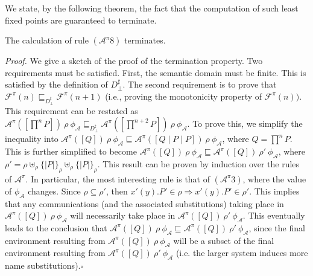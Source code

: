 \documentclass[10pt,a4paper,final,oneside,fleqn]{book}
\begin{document}
We state, by the following theorem, the fact that the computation of such least fixed points are guaranteed to terminate.
\begin{theor}
$ $\\
The calculation of rule $(\mathcal{A}^\pi 8)$ terminates.
\end{theor}
{\itshape Proof.\/} We give a sketch of the proof of the termination property. Two requirements must be satisfied.  First, the semantic domain must be finite. This is satisfied by the definition of $D^\sharp_\bot$. The second requirement is to prove that $\mathcal{F}^\pi(n)\sqsubseteq_{D^\sharp_\bot}\mathcal{F}^\pi(n+1)$ (i.e., proving the monotonicity property of $\mathcal{F}^{\pi}(n))$.  This requirement can be restated as  $\mathcal{A}^{\pi}(\![\overset{n}{\prod}P]\!)~\rho~\phi_\mathcal{A}\sqsubseteq_{D^\sharp_\bot}\mathcal{A}^\pi(\![\overset{n+2}{\prod}P]\!)~\rho~\phi_\mathcal{A}$.  To prove this, we simplify the inequality into $\mathcal{A}^{\pi}(\![Q]\!)~\rho~\phi_\mathcal{A}\sqsubseteq\mathcal{A}^\pi(\![Q\mid P\mid P]\!)~\rho~\phi_\mathcal{A}$, where $Q=\overset{n}{\prod}P$. This is further simplified to become $\mathcal{A}^{\pi}(\![Q]\!)~\rho~\phi_\mathcal{A}\sqsubseteq\mathcal{A}^\pi(\![Q]\!)~\rho'~\phi_\mathcal{A}$, where $\rho'=\rho\uplus_\rho\{\!|P|\!\}_\rho\uplus_\rho\{\!|P|\!\}_\rho$.  This result can be proven by induction over the rules of $\mathcal{A}^{\pi}$. In particular, the most interesting rule is that of $(\mathcal{A}^\pi 3)$, where the value of $\phi_\mathcal{A}$ changes.  Since $\rho\subseteq\rho'$, then $x'(y).P'\in\rho\Rightarrow x'(y).P'\in\rho'$. This implies that any communications (and the associated substitutions) taking place in $\mathcal{A}^{\pi}(\![Q]\!)~\rho~\phi_\mathcal{A}$ will necessarily take place in $\mathcal{A}^{\pi}(\![Q]\!)~\rho'~\phi_\mathcal{A}$.  This eventually leads to the conclusion that $\mathcal{A}^{\pi}(\![Q]\!)~\rho~\phi_\mathcal{A}\sqsubseteq\mathcal{A}^\pi(\![Q]\!)~\rho'~\phi_\mathcal{A}$, since the final environment resulting from $\mathcal{A}^{\pi}(\![Q]\!)~\rho~\phi_\mathcal{A}$ will be a subset of the final environment resulting from $\mathcal{A}^\pi(\![Q]\!)~\rho'~\phi_\mathcal{A}$ (i.e. the larger system induces more name substitutions).\hfill$\square$
\end{document}
